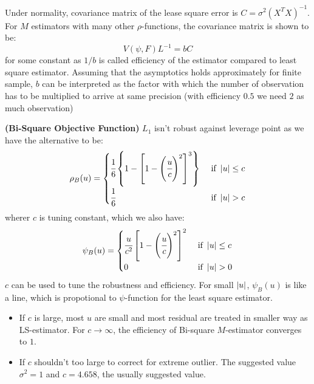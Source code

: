 \begin{remark}
    Under normality, covariance matrix of the lease square error is $C = \sigma^2(X^TX)^{-1}$. For $M$ estimators with many other $\rho$-functions, the covariance matrix is shown to be:
    \begin{equation*}
        V(\psi, F)L^{-1} = bC
    \end{equation*}
    for some constant as $1/b$ is called efficiency of the estimator compared to least square estimator. Assuming that the asymptotics holds approximately for finite sample, $b$ can be interpreted as the factor with which the number of observation has to be multiplied to arrive at same precision  (with efficiency $0.5$ we need $2$ as much observation)
\end{remark}

\begin{definition}{\textbf{(Bi-Square Objective Function)}}
    $L_1$ isn't robust against leverage point as we have the alternative to be:
    \begin{equation*}
        \rho_B (u) = \begin{cases}
            \cfrac{1}{6}\left\{ 1 - \left[ 1 - \left( \cfrac{u}{c} \right)^2  \right]^3 \right\} & \text{ if } \left| u \right| \le c \\
            \cfrac{1}{6} & \text{ if } \left| u \right| > c
        \end{cases}
    \end{equation*}
    wherer $c$ is tuning constant, which we also have:
    \begin{equation*}
        \psi_B (u) = \begin{cases}
            \cfrac{u}{c^2}\left[ 1 - \left( \cfrac{u}{c} \right)^2  \right]^2 & \text{ if } \left| u \right| \le c \\ 
            0 & \text{ if } \left| u \right| > 0
        \end{cases}
    \end{equation*}
    $c$ can be used to tune the robustness and efficiency. For small $\left| u \right|$, $\psi_B(u)$ is like a line, which is propotional to $\psi$-function for the least square estimator. 
    \begin{itemize}
        \item If $c$ is large, most $u$ are small and most residual are treated in smaller way as LS-estimator. For $c\rightarrow\infty$, the efficiency of Bi-square $M$-estimator converges to $1$. 
        \item If $c$ shouldn't too large to correct for extreme outlier. The suggested value $\sigma^2=1$ and $c=4.658$, the usually suggested value. 
    \end{itemize}
\end{definition}

